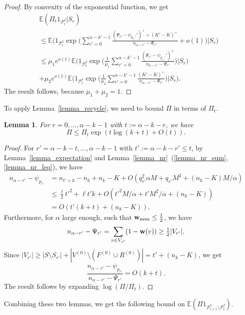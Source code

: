 \documentclass{article}
\theoremstyle{plain}
\theoremstyle{remark}
\theoremstyle{plain}
\newtheorem{lemma}[theorem]{Lemma}
\numberwithin{equation}{section}
\renewcommand{\b}{{\bf{w}}}
\begin{document}
\begin{proof}
		By convexity of the exponential function, we get
		\begin{align}
			&\mathbb{E}(\Pi_t1_{\mathcal{P}_t^{\delta}}|S_r)
			\\&\leq\mathbb{E}\Bigg(1_{\mathcal{P}_t^{\delta}}\exp\Bigg(\sum_{r'=0}^{\alpha-k'-1}\frac{(\Psi_{r'}-\psi_{p_{r'}'}')^++(K'-K)^+}{n_{\alpha-r'}-\Psi_{r'}}+o(1)\Bigg)\Bigg|S_r\Bigg)
			\\&\leq\mu_1e^{o(1)}\mathbb{E}\Bigg(1_{\mathcal{P}_t^{\delta}}\exp\Bigg(\tfrac1{\mu_1}\sum_{r'=0}^{\alpha-k'-1}\frac{(\Psi_{r'}-\psi_{p_{r'}'}')^+}{n_{\alpha-r'}-\Psi_{r'}}\Bigg)\Bigg|S_r\Bigg)
			\\&+\mu_2e^{o(1)}\mathbb{E}\Bigg(1_{\mathcal{P}_t^{\delta}}\exp\Bigg(\tfrac1{\mu_2}\sum_{r'=0}^{\alpha-k'-1}\frac{(K'-K)^+}{n_{\alpha-r'}-\Psi_{r'}}\Bigg)\Bigg|S_r\Bigg).
		\end{align}
		The result follows, because $\mu_1+\mu_2=1$.
	\end{proof}
	
	To apply Lemma~\ref{lemma_recycle}, we need to bound $\Pi$ in terms of $\Pi_t$.
	
	\begin{lemma}\label{lemma_pit}
		For $r=0,\ldots,\alpha-k-1$ with $t:=\alpha-k-r$, we have $$\Pi\leq\Pi_t\exp(t\log(k+t)+O(t)).$$
	\end{lemma}
	
	\begin{proof}
		For $r'=\alpha-k-t,\ldots,\alpha-k-1$ with $t':=\alpha-k-r'\leq t$, by Lemma~\ref{lemma_expectation} and Lemma~\ref{lemma_nr}~(\ref{lemma_nr_sum},\ref{lemma_nr_leq}), we have
		\begin{align}
			n_{\alpha-r'}-\psi_{p_{r'}}
			&=n_{t'+k}-n_k+n_k-K+O(q_{r'}^2\alpha M+q_{r'}M^2+(n_k-K)M/\alpha)
			\\&\leq\tfrac{\ell}{2}t'^2+\ell t'k+O(t'^2M/\alpha+t'M^2/\alpha+(n_k-K))
			\\&=O(t'(k+t)+(n_k-K)).
		\end{align}
		Furthermore, for $\alpha$ large enough, such that $\b_{\max}\leq\tfrac12$, we have $$n_{\alpha-r'}-\Psi_{r'}=\sum_{v\in V_{r'}}(1-\b(v))\geq\tfrac12|V_{r'}|.$$ Since $|V_{r'}|\geq|S\setminus S_{r'}|+|V^{(0)}\setminus (F^{(0)}\cup R^{(0)})|=t'+(n_k-K)$, we get $$\frac{n_{\alpha-r'}-\psi_{p_{r'}}}{n_{\alpha-r'}-\Psi_{r'}}=O(k+t).$$ The result follows by expanding $\log(\Pi/\Pi_t)$.
	\end{proof}
	
	Combining these two lemmas, we get the following bound on $\mathbb{E}(\Pi1_{\mathcal{P}_{t+1}^{\delta}\setminus\mathcal{P}_t^{\delta}})$.
	
\end{document}
